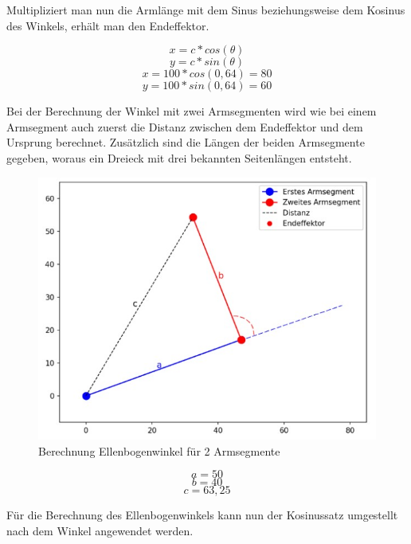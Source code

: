 \documentclass[12pt]{article}
\begin{document}
    

    Multipliziert man nun die Armlänge mit dem Sinus beziehungsweise dem Kosinus des Winkels, erhält
    man den Endeffektor.

    \[
        x=c * cos(\theta)
    \]
    \[
        y=c * sin(\theta)
    \]
    \[
        x=100 * cos(0,64)=80
    \]
    \[
        y=100 * sin(0,64)=60
    \]

    


    Bei der Berechnung der Winkel mit zwei Armsegmenten wird wie bei einem Armsegment auch zuerst
    die Distanz zwischen dem Endeffektor und dem Ursprung berechnet. Zusätzlich sind die Längen der
    beiden Armsegmente gegeben, woraus ein Dreieck mit drei bekannten Seitenlängen entsteht.

    \begin{figure}[h]
        \centering
        \includegraphics[width = \linewidth]{Bild 3}
        \caption{Berechnung Ellenbogenwinkel für 2 Armsegmente}
    \end{figure}

    \[
        a=50
    \]
    \[
        b=40
    \]
    \[
        c=63,25
    \]

    Für die Berechnung des Ellenbogenwinkels kann nun der Kosinussatz umgestellt nach dem Winkel
    angewendet werden.
\end{document}
